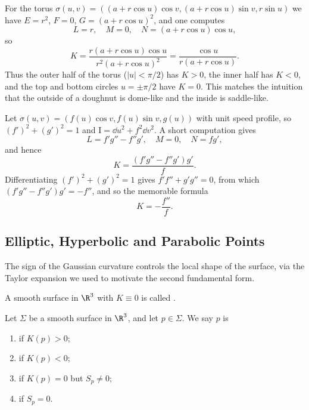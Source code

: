 \begin{example}
    For the torus $\sigma(u,v) = ((a+r\cos u)\cos v, (a+r\cos u)\sin v, r\sin u)$ we have $E = r^2$, $F = 0$, $G = (a+r\cos u)^2$, and one computes
    $$
    L = r, \quad M = 0, \quad N = (a+r\cos u)\cos u,
    $$
    so
    $$
    K = \frac{r(a+r\cos u)\cos u}{r^2(a+r\cos u)^2} = \frac{\cos u}{r(a + r\cos u)}.
    $$
    Thus the outer half of the torus ($|u| < \pi/2$) has $K > 0$, the inner half has $K < 0$, and the top and bottom circles $u = \pm\pi/2$ have $K = 0$. This matches the intuition that the outside of a doughnut is dome-like and the inside is saddle-like.
\end{example}

\begin{example}
    Let $\sigma(u,v) = (f(u)\cos v, f(u)\sin v, g(u))$ with unit speed profile, so $(f')^2 + (g')^2 = 1$ and $\mathrm{I} = \dd u^2 + f^2 \dd v^2$. A short computation gives
    $$
    L = f'g'' - f''g', \quad M = 0, \quad N = fg',
    $$
    and hence
    $$
    K = \frac{(f'g''-f''g')g'}{f}.
    $$
    Differentiating $(f')^2+(g')^2 = 1$ gives $f'f''+g'g'' = 0$, from which $(f'g''-f''g')g' = -f''$, and so the memorable formula
    $$
    K = -\frac{f''}{f}.
    $$
\end{example}

\subsection{Elliptic, Hyperbolic and Parabolic Points}

The sign of the Gaussian curvature controls the local shape of the surface, via the Taylor expansion we used to motivate the second fundamental form.

\begin{definition}
    A smooth surface in $\R^3$ with $K \equiv 0$ is called .
\end{definition}

\begin{definition}
    Let $\Sigma$ be a smooth surface in $\R^3$, and let $p \in \Sigma$. We say $p$ is
    \begin{enumerate}[label=(\roman*)]
        \item {} if $K(p) > 0$;
        \item {} if $K(p) < 0$;
        \item {} if $K(p) = 0$ but $S_p \neq 0$;
        \item {} if $S_p = 0$.
    \end{enumerate}
\end{definition}

